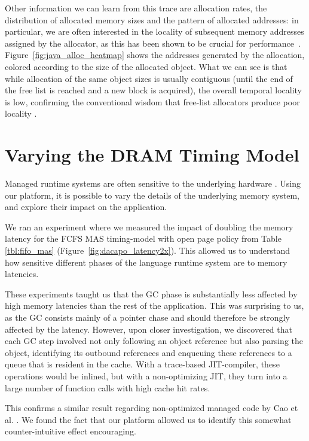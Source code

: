 Other information we can learn from this trace are allocation rates, the
distribution of allocated memory sizes and the pattern of allocated addresses:
in particular, we are often interested in the locality of subsequent memory
addresses assigned by the allocator, as this has been shown to be crucial for
performance~\cite{Blackburn:2004:OWH:998675.999420}.
Figure~\ref{fig:java_alloc_heatmap} shows the addresses generated by the
allocation, colored according to the size of the allocated object. What we can
see is that while allocation of the same object sizes is usually contiguous
(until the end of the free list is reached and a new block is acquired), the
overall temporal locality is low, confirming the conventional wisdom that
free-list allocators produce poor locality
\cite{Blackburn:2004:OWH:998675.999420}.

\section{Varying the DRAM Timing Model}

Managed runtime systems are often sensitive to the underlying hardware
\cite{Cao:2012:YYP:2337159.2337185}. Using our platform, it is possible to vary
the details of the underlying memory system, and explore their impact on the
application.

We ran an experiment where we measured the impact of doubling the memory
latency for the FCFS MAS timing-model with open page policy from Table
\ref{tbl:fifo_mas} (Figure~\ref{fig:dacapo_latency2x}). This allowed us to
understand how sensitive different phases of the language runtime system are to
memory latencies.

These experiments taught us that the GC phase is substantially less affected by
high memory latencies than the rest of the application. This was surprising to
us, as the GC consists mainly of a pointer chase and should therefore be
strongly affected by the latency. However, upon closer investigation, we
discovered that each GC step involved not only following an object reference
but also parsing the object, identifying its outbound references and enqueuing
these references to a queue that is resident in the cache. With a trace-based
JIT-compiler, these operations would be inlined, but with a non-optimizing JIT,
they turn into a large number of function calls with high cache hit rates.

This confirms a similar result regarding non-optimized managed code by Cao et
al. \cite{Cao:2012:YYP:2337159.2337185}. We found the fact that our platform
allowed us to identify this somewhat counter-intuitive effect encouraging.


